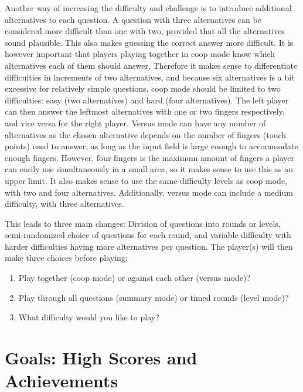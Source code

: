 Another way of increasing the difficulty and challenge is to introduce additional alternatives to each question. A question with three alternatives can be considered more difficult than one with two, provided that all the alternatives sound plausible. This also makes guessing the correct answer more difficult. It is however important that players playing together in coop mode know which alternatives each of them should answer. Therefore it makes sense to differentiate difficulties in increments of two alternatives, and because six alternatives is a bit excessive for relatively simple questions, coop mode should be limited to two difficulties: easy (two alternatives) and hard (four alternatives). The left player can then answer the leftmost alternatives with one or two fingers respectively, and vice versa for the right player. Versus mode can have any number of alternatives as the chosen alternative depends on the number of fingers (touch points) used to answer, as long as the input field is large enough to accommodate enough fingers. However, four fingers is the maximum amount of fingers a player can easily use simultaneously in a small area, so it makes sense to use this as an upper limit. It also makes sense to use the same difficulty levels as coop mode, with two and four alternatives. Additionally, versus mode can include a medium difficulty, with three alternatives.

This leads to three main changes: Division of questions into rounds or levels, semi-randomized choice of questions for each round, and variable difficulty with harder difficulties having more alternatives per question. The player(s) will then make three choices before playing:
\begin{enumerate}
	\item Play together (coop mode) or against each other (versus mode)?
	\item Play through all questions (summary mode) or timed rounds (level mode)?
	\item What difficulty would you like to play?
\end{enumerate}


\section{Goals: High Scores and Achievements}

